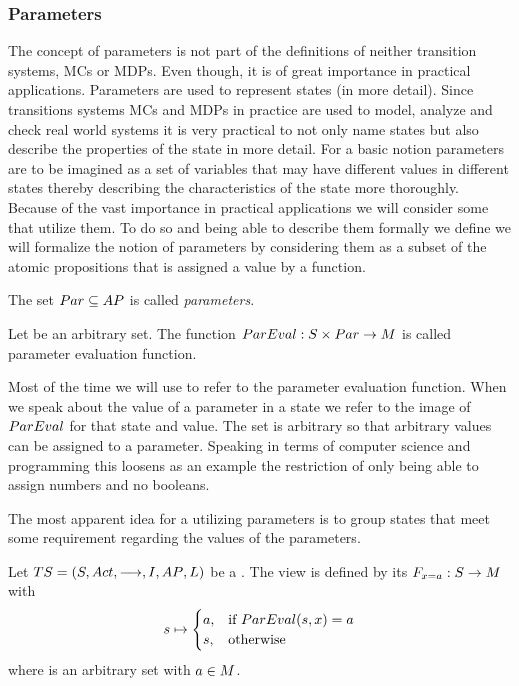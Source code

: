 \documentclass[preview]{standalone}
\begin{document}
\subsubsection{Parameters}
The concept of parameters is not part of the definitions of neither transition systems, MCs or MDPs. Even though, it is of great importance in practical applications. Parameters are used to represent states (in more detail). Since transitions systems MCs and MDPs in practice are used to model, analyze and check real world systems it is very practical to not only name states but also describe the properties of the state in more detail. For a basic notion parameters are to be imagined as a set of variables that may have different values in different states thereby describing the characteristics of the state more thoroughly. Because of the vast importance in practical applications we will consider some \viewsN that utilize them. To do so and being able to describe them formally we define we will formalize the notion of parameters by considering them as a subset of the atomic propositions \atomicprops that is assigned a value by a function.

\begin{definition}
	The set ${Par} \subseteq {AP}$ is called \emph{parameters}.
\end{definition}

\begin{definition}
	Let \paramevalimg be an arbitrary set. The function ${ParEval} : {S} \times {Par} \to {\ensuremath{{M}}}$ is called parameter evaluation function.
\end{definition} 

Most of the time we will use \parameval to refer to the parameter evaluation function. When we speak about the value of a parameter in a state we refer to the image of ${ParEval}$ for that state and value. The set \paramevalimg is arbitrary so that arbitrary values can be assigned to a parameter. Speaking in terms of computer science and programming this loosens as an example the restriction of only being able to assign numbers and no booleans.

The most apparent idea for a \viewN utilizing parameters is to group states that meet some requirement regarding the values of the parameters.


\begin{definition}
	Let ${TS} = {({S}, {Act}, {\longrightarrow}, {I}, {AP}, {L})}$ be a \chosengraphtypeN. The view \viewparamvalues is defined by its \grpfctN ${{{F}}_{{x} = {a}}} : {S} \to {\ensuremath{{M}}}$ with
	\[
	{s} \mapsto
	\begin{cases}
		{a}, &\text{if } {ParEval}({s}, {x}) = {a}\\
		{s}, 	&\text{otherwise}
	\end{cases}
	\]
	where \imggrp is an arbitrary set with ${a} \in {\ensuremath{{M}}}$.
\end{definition}
\end{document}

